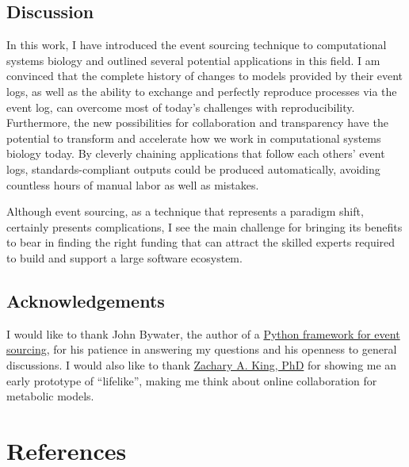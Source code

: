 \documentclass[
  a4paper,
]{scrartcl}
\begin{document}
\subsection{Discussion}\label{discussion}

In this work, I have introduced the event sourcing technique to
computational systems biology and outlined several potential
applications in this field. I am convinced that the complete history of
changes to models provided by their event logs, as well as the ability
to exchange and perfectly reproduce processes via the event log, can
overcome most of today's challenges with reproducibility. Furthermore,
the new possibilities for collaboration and transparency have the
potential to transform and accelerate how we work in computational
systems biology today. By cleverly chaining applications that follow
each others' event logs, standards-compliant outputs could be produced
automatically, avoiding countless hours of manual labor as well as
mistakes.

Although event sourcing, as a technique that represents a paradigm
shift, certainly presents complications, I see the main challenge for
bringing its benefits to bear in finding the right funding that can
attract the skilled experts required to build and support a large
software ecosystem.

\subsection{Acknowledgements}\label{acknowledgements}

I would like to thank John Bywater, the author of a
\href{https://eventsourcing.readthedocs.io/}{Python framework for event
sourcing}, for his patience in answering my questions and his openness
to general discussions. I would also like to thank
\href{https://orcid.org/0000-0003-1238-1499}{Zachary A. King, PhD} for
showing me an early prototype of ``lifelike'', making me think about
online collaboration for metabolic models.

\section*{References}\label{bibliography}
\end{document}
